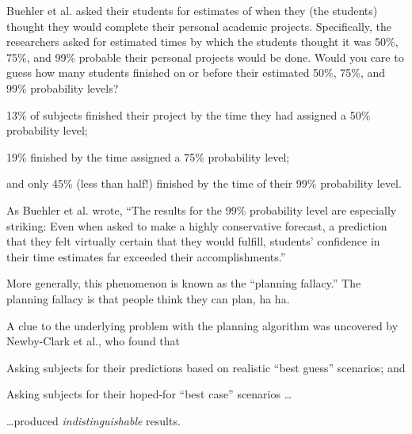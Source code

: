 {
 Buehler et al. asked their students for estimates of when they
(the students) thought they would complete their personal academic
projects. Specifically, the researchers asked for
estimated times by which the students thought it was 50\%, 75\%, and
99\% probable their personal projects would be done. Would you care to
guess how many students finished on or before their estimated 50\%,
75\%, and 99\% probability levels?}

{
 13\% of subjects finished their project by the time they had
assigned a 50\% probability level;}

{
 19\% finished by the time assigned a 75\% probability level;}

{
 and only 45\% (less than half!) finished by the time of their 99\%
probability level.}

{
 As Buehler et al. wrote, ``The results for the
99\% probability level are especially striking: Even when asked to make
a highly conservative forecast, a prediction that they felt virtually
certain that they would fulfill, students' confidence
in their time estimates far exceeded their
accomplishments.''}

{
 More generally, this phenomenon is known as the
``planning fallacy.'' The planning
fallacy is that people think they can plan, ha ha.}

{
 A clue to the underlying problem with the planning algorithm was
uncovered by Newby-Clark et al., who found that}

{
 Asking subjects for their predictions based on realistic
``best guess'' scenarios; and}

{
 Asking subjects for their hoped-for ``best
case'' scenarios \ldots}

{
 \ldots produced \textit{indistinguishable}
results.}

